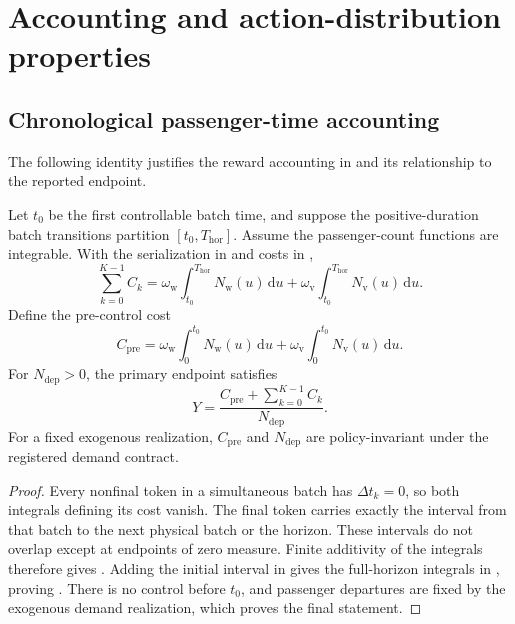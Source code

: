 \section{Accounting and action-distribution properties}
\label{app:properties}

\subsection{Chronological passenger-time accounting}
\label{app:properties:ledger}

The following identity justifies the reward accounting in
 and its relationship to the reported endpoint.

\begin{proposition}
\label{prop:ledger}
Let $t_0$ be the first controllable batch time, and suppose the positive-duration
batch transitions partition $[t_0,T_{\mathrm{hor}}]$. Assume the passenger-count
functions are integrable. With the serialization in 
and costs in ,
\begin{equation}
\sum_{k=0}^{K-1}C_k
=\omega_{\mathrm{w}}\int_{t_0}^{T_{\mathrm{hor}}}N_{\mathrm{w}}(u)\,\mathrm{d}u
+\omega_{\mathrm{v}}\int_{t_0}^{T_{\mathrm{hor}}}N_{\mathrm{v}}(u)\,\mathrm{d}u.
\label{eq:ledger_identity}
\end{equation}
Define the pre-control cost
\begin{equation}
C_{\mathrm{pre}}=
\omega_{\mathrm{w}}\int_0^{t_0}N_{\mathrm{w}}(u)\,\mathrm{d}u
+\omega_{\mathrm{v}}\int_0^{t_0}N_{\mathrm{v}}(u)\,\mathrm{d}u.
\label{eq:precontrol_cost}
\end{equation}
For $N_{\mathrm{dep}}>0$, the primary endpoint satisfies
\begin{equation}
Y=\frac{C_{\mathrm{pre}}+\sum_{k=0}^{K-1}C_k}{N_{\mathrm{dep}}}.
\label{eq:endpoint_ledger}
\end{equation}
For a fixed exogenous realization, $C_{\mathrm{pre}}$ and $N_{\mathrm{dep}}$
are policy-invariant under the registered demand contract.
\end{proposition}

\begin{proof}
Every nonfinal token in a simultaneous batch has $\Delta t_k=0$, so both
integrals defining its cost vanish. The final token carries exactly the
interval from that batch to the next physical batch or the horizon.
These intervals do not overlap except at endpoints of zero measure. Finite
additivity of the integrals therefore gives .
Adding the initial interval in  gives the full-horizon
integrals in , proving .
There is no control before $t_0$, and passenger departures are fixed by the
exogenous demand realization, which proves the final statement.
\end{proof}

